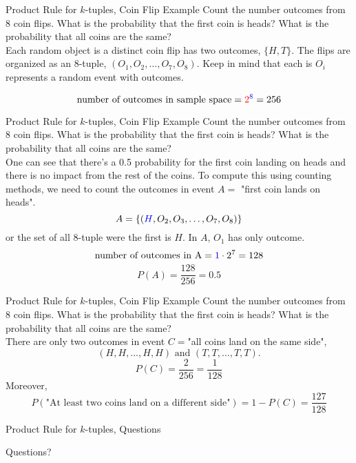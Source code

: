 \documentclass[handout]{beamer}
\newcommand{\blue}[1]{{\color{blue} #1}}
\newcommand{\red}[1]{{\color{red} #1}}
\newcommand{\qtns}[0]{\begin{center} Questions? \end{center}}
\newcommand{\nl}[1]{\vspace{#1 em}}
\begin{document}
\begin{frame}{Product Rule for $k$-tuples, Coin Flip Example}
    Count the number outcomes from \blue{8} \red{coin flips}. What is the probability that the first coin is heads? What is the probability that all coins are the same?\\
    \nl{0.5}
    \pause Each \red{random object} is a distinct \red{coin flip} has \red{two outcomes}, $\{H,T\}$. The flips are organized as an \blue{8}-tuple, $(O_1,O_2,\ldots,O_7,O_8)$. Keep in mind that each is $O_i$ represents a random event with outcomes.

    \pause \[\text{number of outcomes in sample space} = \red{2}^\blue{8} =256\]
\end{frame}

\begin{frame}{Product Rule for $k$-tuples, Coin Flip Example}
    Count the number outcomes from 8 coin flips. What is the probability that the first coin is heads? What is the probability that all coins are the same?\\
    \nl{0.5}
    \pause One can see that there's a 0.5 probability for the first coin landing on heads and there is no impact from the rest of the coins. \pause To compute this using counting methods, we need to count the outcomes in event $A = $ "first coin lands on heads".
    \[A=\{ (\blue{H}, O_2, O_3, \ldots, O_7, O_8) \}\]
    or the set of all 8-tuple were the first is $H$. \blue{In $A$, $O_1$ has only outcome.}
    \pause \[\text{number of outcomes in A} = \blue{1}\cdot 2^7 =128\]
    \[P(A) = \frac{128}{256} = 0.5\]
\end{frame}

\begin{frame}{Product Rule for $k$-tuples, Coin Flip Example}
    Count the number outcomes from 8 coin flips. What is the probability that the first coin is heads? What is the probability that all coins are the same?\\
    \nl{0.5}
    \pause There are only two outcomes in event $C =$"all coins land on the same side",
    \[(H,H, \ldots, H,H) \text{ and } (T,T, \ldots, T,T).\]
    \[P(C) = \frac{2}{256} = \frac{1}{128}\]
    \pause Moreover, 
    \[P(\text{"At least two coins land on a different side"}) = 1-P(C) = \frac{127}{128}\]
\end{frame}

\begin{frame}{Product Rule for $k$-tuples, Questions}
    \qtns
\end{frame}
\end{document}
